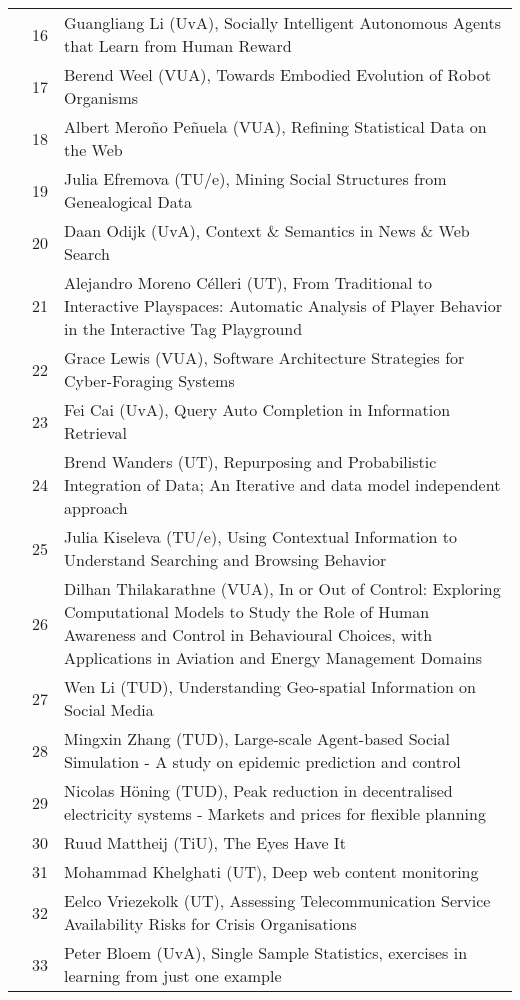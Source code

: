 \begin{xltabular}{\linewidth}{@{} l @{\hspace{0.5em}} l @{\hspace{1em}} X @{}}
	&	 16	&	 Guangliang Li (UvA), Socially Intelligent Autonomous Agents that Learn from Human Reward\\
	&	 17	&	 Berend Weel (VUA), Towards Embodied Evolution of Robot Organisms\\
	&	 18	&	 Albert Mero\~{n}o Pe\~{n}uela (VUA), Refining Statistical Data on the Web\\
	&	 19	&	 Julia Efremova (TU/e), Mining Social Structures from Genealogical Data\\
	&	 20	&	 Daan Odijk (UvA), Context \& Semantics in News \& Web Search\\
	&	 21	&	 Alejandro Moreno C\'{e}lleri (UT), From Traditional to Interactive Playspaces: Automatic Analysis of Player Behavior in the Interactive Tag Playground\\
	&	 22	&	 Grace Lewis (VUA), Software Architecture Strategies for Cyber-Foraging Systems\\
	&	 23	&	 Fei Cai (UvA), Query Auto Completion in Information Retrieval\\
	&	 24	&	 Brend Wanders (UT), Repurposing and Probabilistic Integration of Data; An Iterative and data model independent approach\\
	&	 25	&	 Julia Kiseleva (TU/e), Using Contextual Information to Understand Searching and Browsing Behavior\\
	&	 26	&	 Dilhan Thilakarathne (VUA), In or Out of Control: Exploring Computational Models to Study the Role of Human Awareness and Control in Behavioural Choices, with Applications in Aviation and Energy Management Domains\\
	&	 27	&	 Wen Li (TUD), Understanding Geo-spatial Information on Social Media\\
	&	 28	&	 Mingxin Zhang (TUD), Large-scale Agent-based Social Simulation - A study on epidemic prediction and control\\
	&	 29	&	 Nicolas H\"{o}ning (TUD), Peak reduction in decentralised electricity systems - Markets and prices for flexible planning\\
	&	 30	&	 Ruud Mattheij (TiU), The Eyes Have It\\
	&	 31	&	 Mohammad Khelghati (UT), Deep web content monitoring\\
	&	 32	&	 Eelco Vriezekolk (UT), Assessing Telecommunication Service Availability Risks for Crisis Organisations\\
	&	 33	&	 Peter Bloem (UvA), Single Sample Statistics, exercises in learning from just one example\\

\end{xltabular}
